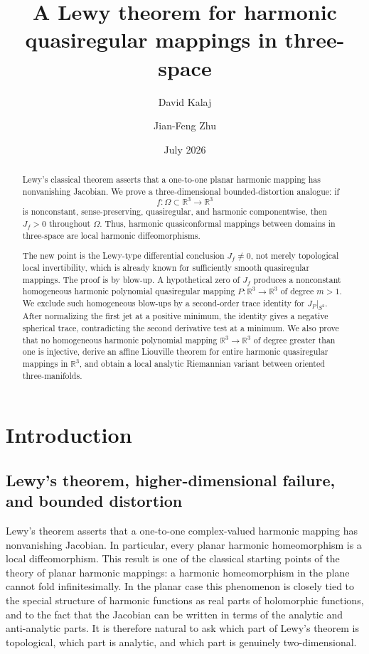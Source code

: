 \documentclass[10pt]{amsart}
\title[A Lewy theorem for harmonic quasiregular maps]{A Lewy theorem for harmonic quasiregular mappings in three-space}
\author{David Kalaj}
\author{Jian-Feng Zhu}
\date{July 2026}
\numberwithin{equation}{section}
\theoremstyle{definition}
\begin{document}
\begin{abstract}
Lewy's classical theorem asserts that a one-to-one planar harmonic mapping has nonvanishing Jacobian. We prove a three-dimensional bounded-distortion analogue: if
\[
        f:\Omega\subset \mathbb R^3\to \mathbb R^3
\]
is nonconstant, sense-preserving, quasiregular, and harmonic componentwise, then \(J_f>0\) throughout \(\Omega\). Thus, harmonic quasiconformal mappings between domains in three-space are local harmonic diffeomorphisms.

The new point is the Lewy-type differential conclusion \(J_f\neq0\), not merely topological local invertibility, which is already known for sufficiently smooth quasiregular mappings. The proof is by blow-up. A hypothetical zero of \(J_f\) produces a nonconstant homogeneous harmonic polynomial quasiregular mapping \(P:\mathbb R^3\to\mathbb R^3\) of degree \(m>1\). We exclude such homogeneous blow-ups by a second-order trace identity for \(J_P|_{S^2}\). After normalizing the first jet at a positive minimum, the identity gives a negative spherical trace, contradicting the second derivative test at a minimum. We also prove that no homogeneous harmonic polynomial mapping \(\mathbb R^3\to\mathbb R^3\) of degree greater than one is injective, derive an affine Liouville theorem for entire harmonic quasiregular mappings in \(\mathbb R^3\), and obtain a local analytic Riemannian variant between oriented three-manifolds.
\end{abstract}

\maketitle


\section{Introduction}

\subsection{Lewy's theorem, higher-dimensional failure, and bounded distortion}

Lewy's theorem \cite{Lewy1936} asserts that a one-to-one complex-valued
harmonic mapping has nonvanishing Jacobian. In particular, every planar
harmonic homeomorphism is a local diffeomorphism. This result is one of the
classical starting points of the theory of planar harmonic mappings: a
harmonic homeomorphism in the plane cannot fold infinitesimally. In the planar
case this phenomenon is closely tied to the special structure of harmonic
functions as real parts of holomorphic functions, and to the fact that the
Jacobian can be written in terms of the analytic and anti-analytic parts.
It is therefore natural to ask which part of Lewy's theorem is topological,
which part is analytic, and which part is genuinely two-dimensional.
\end{document}
